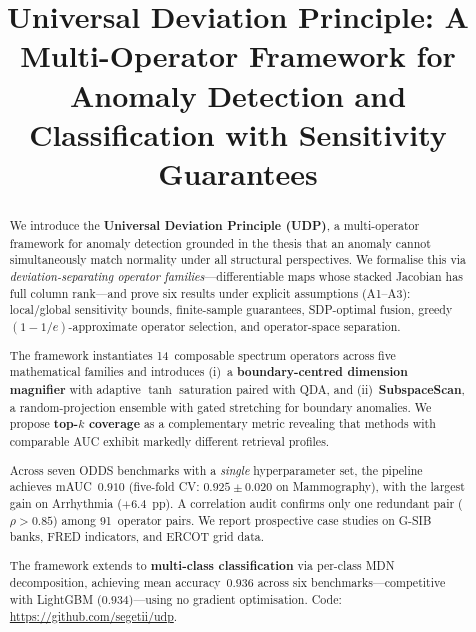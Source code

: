 \documentclass[journal]{IEEEtran}
\begin{document}
\title{Universal Deviation Principle: A Multi-Operator Framework for Anomaly Detection and Classification with Sensitivity Guarantees}

\author{
}

\maketitle

\begin{abstract}
We introduce the \textbf{Universal Deviation Principle (UDP)}, a multi-operator framework for anomaly detection grounded in the thesis that an anomaly cannot simultaneously match normality under all structural perspectives.  We formalise this via \emph{deviation-separating operator families}---differentiable maps whose stacked Jacobian has full column rank---and prove six results under explicit assumptions (A1--A3): local/global sensitivity bounds, finite-sample guarantees, SDP-optimal fusion, greedy $(1{-}1/e)$-approximate operator selection, and operator-space separation.

The framework instantiates 14~composable spectrum operators across five mathematical families and introduces (i)~a \textbf{boundary-centred dimension magnifier} with adaptive $\tanh$ saturation paired with QDA, and (ii)~\textbf{SubspaceScan}, a random-projection ensemble with gated stretching for boundary anomalies.  We propose \textbf{top-$k$ coverage} as a complementary metric revealing that methods with comparable AUC exhibit markedly different retrieval profiles.

Across seven ODDS benchmarks with a \emph{single} hyperparameter set, the pipeline achieves mAUC~$0.910$ (five-fold CV: $0.925 \pm 0.020$ on Mammography), with the largest gain on Arrhythmia ($+6.4$~pp).  A correlation audit confirms only one redundant pair ($\rho > 0.85$) among 91~operator pairs.  We report prospective case studies on G-SIB banks, FRED indicators, and ERCOT grid data.

The framework extends to \textbf{multi-class classification} via per-class MDN decomposition, achieving mean accuracy~$0.936$ across six benchmarks---competitive with LightGBM ($0.934$)---using no gradient optimisation.  Code: \url{https://github.com/segetii/udp}.
\end{abstract}
\end{document}
